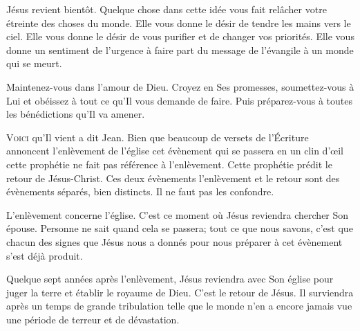 Jésus revient bientôt. Quelque chose dans cette idée vous fait
 relâcher votre étreinte des choses du monde.
 Elle vous donne le désir de tendre les mains vers le ciel.
 Elle vous donne le désir de vous purifier et de changer vos priorités.
 Elle vous donne un sentiment de l'urgence à faire part du message
 de l'évangile à un monde qui se meurt. 

Maintenez-vous dans l'amour de Dieu. Croyez en Ses promesses,
 soumettez-vous à Lui et obéissez à tout ce qu'Il vous demande de faire.
 Puis préparez-vous à toutes les bénédictions qu'Il va amener. 

\dvrule







\lettrine[ante=\Og]{V}{oici} qu'Il vient \Fg{} 
 a dit Jean.
 Bien que beaucoup de versets de l'Écriture annoncent
 l'enlèvement de l'église 
 \ocadr cet évènement qui se passera en un clin d'\oe{}il \fcadr{} 
 cette prophétie ne fait pas référence à l'enlèvement.
 Cette prophétie prédit le retour de Jésus-Christ.
 Ces deux évènements \ocadr l'enlèvement et le retour \fcadr{}
 sont des évènements séparés, bien distincts.
 Il ne faut pas les confondre. 

L'enlèvement concerne l'église. 
 C'est ce moment où Jésus reviendra chercher Son épouse.
 Personne ne sait quand cela se passera; tout ce que nous savons,
 c'est que chacun des signes que Jésus nous a donnés pour nous préparer
 à cet évènement s'est déjà produit. 


Quelque  sept années après l'enlèvement,
 Jésus reviendra avec Son église pour juger la terre
 et établir le royaume de Dieu. C'est le retour de Jésus.
 Il surviendra après un temps de grande tribulation
 telle que le monde n'en a encore jamais vue
 \ocadr une période de terreur et de dévastation. 

